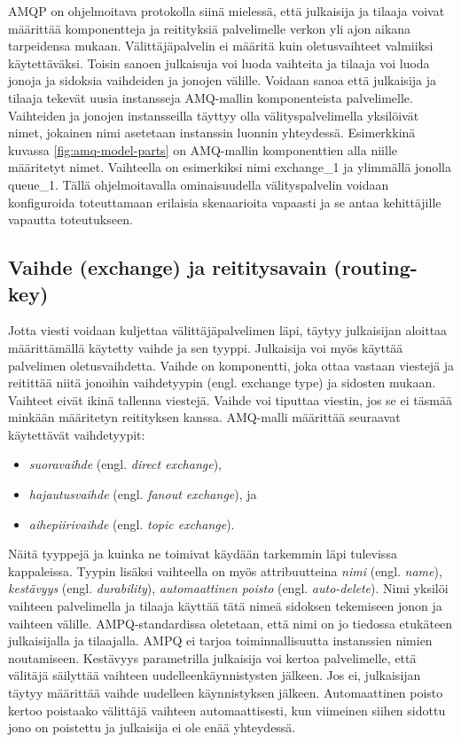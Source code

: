 AMQP on ohjelmoitava protokolla siinä mielessä, että julkaisija ja tilaaja voivat määrittää komponentteja ja reitityksiä palvelimelle verkon yli ajon aikana tarpeidensa mukaan. Välittäjäpalvelin ei määritä kuin oletusvaihteet valmiiksi käytettäväksi. Toisin sanoen julkaisuja voi luoda vaihteita ja tilaaja voi luoda jonoja ja sidoksia vaihdeiden ja jonojen välille. Voidaan sanoa että julkaisija ja tilaaja tekevät uusia instansseja AMQ-mallin komponenteista palvelimelle. Vaihteiden ja jonojen instansseilla täyttyy olla välityspalvelimella yksilöivät nimet, jokainen nimi asetetaan instanssin luonnin yhteydessä. Esimerkkinä kuvassa \ref{fig:amq-model-parts} on AMQ-mallin komponenttien alla niille määritetyt nimet. Vaihteella on esimerkiksi nimi exchange\_1 ja ylimmällä jonolla queue\_1. Tällä ohjelmoitavalla ominaisuudella välityspalvelin voidaan konfiguroida toteuttamaan erilaisia skenaarioita vapaasti ja se antaa kehittäjille vapautta toteutukseen.


\subsection{Vaihde (exchange) ja reititysavain (routing-key)}
Jotta viesti voidaan kuljettaa välittäjäpalvelimen läpi, täytyy julkaisijan aloittaa määrittämällä käytetty vaihde ja sen tyyppi. Julkaisija voi myös käyttää palvelimen oletusvaihdetta. Vaihde on komponentti, joka ottaa vastaan viestejä ja reitittää niitä jonoihin vaihdetyypin (engl. exchange type) ja sidosten mukaan. Vaihteet eivät ikinä tallenna viestejä. Vaihde voi tiputtaa viestin, jos se ei täsmää minkään määritetyn reitityksen kanssa. AMQ-malli määrittää seuraavat käytettävät vaihdetyypit:
\begin{itemize}
	\item \emph{suoravaihde} (engl. \emph{direct exchange}),
	\item \emph{hajautusvaihde} (engl. \emph{fanout exchange}), ja
	\item \emph{aihepiirivaihde} (engl. \emph{topic exchange}).
\end{itemize}

Näitä tyyppejä ja kuinka ne toimivat käydään tarkemmin läpi tulevissa kappaleissa. Tyypin lisäksi vaihteella on myös attribuutteina \emph{nimi} (engl. \emph{name}), \emph{kestävyys} (engl. \emph{durability}), \emph{automaattinen poisto} (engl. \emph{auto-delete}). Nimi yksilöi vaihteen palvelimella ja tilaaja käyttää tätä nimeä sidoksen tekemiseen jonon ja vaihteen välille. AMPQ-standardissa oletetaan, että nimi on jo tiedossa etukäteen julkaisijalla ja tilaajalla. AMPQ ei tarjoa toiminnallisuutta instanssien nimien noutamiseen. Kestävyys parametrilla julkaisija voi kertoa palvelimelle, että välitäjä säilyttää vaihteen uudelleenkäynnistysten jälkeen. Jos ei, julkaisijan täytyy määrittää vaihde uudelleen käynnistyksen jälkeen. Automaattinen poisto kertoo poistaako välittäjä vaihteen automaattisesti, kun viimeinen siihen sidottu jono on poistettu ja julkaisija ei ole enää yhteydessä.

